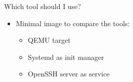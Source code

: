 \documentclass{beamer}
\begin{document}
\begin{frame}{Which tool should I use?}
	\begin{itemize}
		\item Minimal image to compare the tools:
		\begin{itemize}
			\item QEMU target
			\item Systemd as init manager
			\item OpenSSH server as service
		\end{itemize}
	\end{itemize}
\end{frame}
\end{document}
